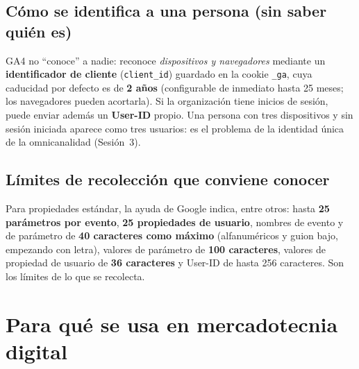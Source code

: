 \documentclass[11pt,letterpaper]{article}
\begin{document}
\subsection{Cómo se identifica a una persona (sin saber quién es)}

GA4 no \enquote{conoce} a nadie: reconoce \emph{dispositivos y navegadores} mediante un \textbf{identificador de cliente} (\texttt{client\_id}) guardado en la cookie \texttt{\_ga}, cuya
caducidad por defecto es de \textbf{2 años} (configurable de inmediato hasta 25 meses; los navegadores pueden acortarla). Si la organización tiene inicios de sesión, puede enviar
además un \textbf{User-ID} propio. Una persona con tres dispositivos y sin sesión iniciada aparece como tres usuarios: es el problema de la identidad única de la omnicanalidad (Sesión~3).

\subsection{Límites de recolección que conviene conocer}

Para propiedades estándar, la ayuda de Google indica, entre otros: hasta \textbf{25 parámetros por evento}, \textbf{25 propiedades de usuario}, nombres de evento y de parámetro de
\textbf{40 caracteres como máximo} (alfanuméricos y guion bajo, empezando con letra), valores de parámetro de \textbf{100 caracteres}, valores de propiedad de usuario de \textbf{36 caracteres} y
User-ID de hasta 256 caracteres. Son los límites de lo que se recolecta.

\section{Para qué se usa en mercadotecnia digital}
\end{document}
